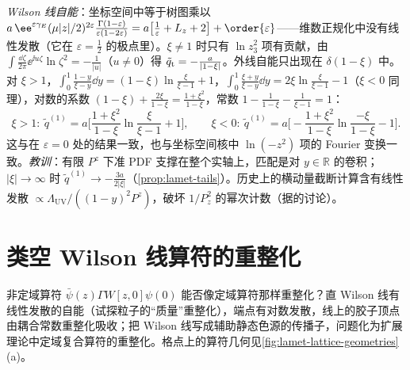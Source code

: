 \begin{example}
\emph{Wilson 线自能}：坐标空间中等于树图乘以 $a\,\ee^{\varepsilon\gamma_E}(\mu|z|/2)^{2\varepsilon}\frac{\Gamma(1-\varepsilon)}{\varepsilon(1-2\varepsilon)}=a\big[\frac1\varepsilon+L_z+2\big]+\order{\varepsilon}$——维数正规化中没有线性发散（它在 $\varepsilon=\frac12$ 的极点里）。$\xi\neq1$ 时只有 $\ln z_3^2$ 项有贡献，由 $\int\frac{\dd\zeta}{2\pi}\ee^{\ii u\zeta}\ln\zeta^2=-\frac1{|u|}$（$u\neq0$）得 $\tilde q_{\rm t}=-\frac a{|1-\xi|}$。外线自能只出现在 $\delta(1-\xi)$ 中。
对 $\xi>1$，$\int_0^1\frac{1-y}{\xi-y}\dd y=(1-\xi)\ln\frac\xi{\xi-1}+1$，$\int_0^1\frac{\xi+y}{\xi-y}\dd y=2\xi\ln\frac\xi{\xi-1}-1$（$\xi<0$ 同理），对数的系数 $(1-\xi)+\frac{2\xi}{1-\xi}=\frac{1+\xi^2}{1-\xi}$，常数 $1-\frac1{1-\xi}-\frac1{\xi-1}=1$：
\begin{equation}\label{eq:lamet-unphysical}
\xi>1:\ \tilde q^{(1)}=a\Big[\frac{1+\xi^2}{1-\xi}\ln\frac{\xi}{\xi-1}+1\Big],\qquad
\xi<0:\ \tilde q^{(1)}=a\Big[-\frac{1+\xi^2}{1-\xi}\ln\frac{-\xi}{1-\xi}-1\Big].
\end{equation}%
这与\cite[附录~B]{IzubuchiEtAl2018}在 $\varepsilon=0$ 处的结果一致，也与坐标空间核中 $\ln(-z^2)$ 项的 Fourier 变换一致。\emph{教训}：有限 $P^z$ 下准 PDF 支撑在整个实轴上，匹配是对 $y\in\mathbb R$ 的卷积；$|\xi|\to\infty$ 时 $\tilde q^{(1)}\to-\frac{3a}{2|\xi|}$（\cref{prop:lamet-tails}）。历史上的横动量截断计算\cite{XiongEtAl2014}含有线性发散 $\propto\Lambda_{\mathrm{UV}}/((1-y)^2P^z)$，破坏 $1/P_z^2$ 的幂次计数（据\cite{JiEtAl2021}的讨论）。
\end{example}

\section{类空 Wilson 线算符的重整化}\label{sec:lamet-renorm}

非定域算符 $\bar\psi(z)\Gamma W[z,0]\psi(0)$ 能否像定域算符那样重整化？直 Wilson 线有线性发散的自能（试探粒子的“质量”重整化），端点有对数发散，线上的胶子顶点由耦合常数重整化吸收\cite{Polyakov1980,Dotsenko:1979wb,BrandtNeriSato1981,Craigie:1980qs}；把 Wilson 线写成辅助静态色源的传播子，问题化为扩展理论中定域复合算符的重整化\cite{Dorn:1986dt}。格点上的算符几何见\cref{fig:lamet-lattice-geometries}(a)。

